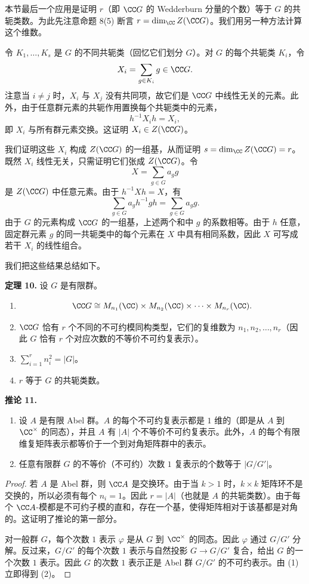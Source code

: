 本节最后一个应用是证明 $r$（即 $\CC G$ 的 Wedderburn 分量的个数）等于 $G$ 的共轭类数。为此先注意命题 8(5) 断言 $r=\dim_{\CC}Z(\CC G)$。我们用另一种方法计算这个维数。

令 $K_1,
\ldots,K_s$ 是 $G$ 的不同共轭类（回忆它们划分 $G$）。对 $G$ 的每个共轭类 $K_i$，令
\[
  X_i=\sum_{g\in K_i}g\in\CC G.
\]
注意当 $i\neq j$ 时，$X_i$ 与 $X_j$ 没有共同项，故它们是 $\CC G$ 中线性无关的元素。此外，由于任意群元素的共轭作用置换每个共轭类中的元素，
\[
  h^{-1}X_i h=X_i,
\]
即 $X_i$ 与所有群元素交换。这证明 $X_i\in Z(\CC G)$。

我们证明这些 $X_i$ 构成 $Z(\CC G)$ 的一组基，从而证明 $s=\dim_{\CC}Z(\CC G)=r$。既然 $X_i$ 线性无关，只需证明它们张成 $Z(\CC G)$。令
\[
  X=\sum_{g\in G}a_g g
\]
是 $Z(\CC G)$ 中任意元素。由于 $h^{-1}Xh=X$，有
\[
  \sum_{g\in G} a_g h^{-1}gh=\sum_{g\in G}a_g g.
\]
由于 $G$ 的元素构成 $\CC G$ 的一组基，上述两个和中 $g$ 的系数相等。由于 $h$ 任意，固定群元素 $g$ 的同一共轭类中的每个元素在 $X$ 中具有相同系数，因此 $X$ 可写成若干 $X_i$ 的线性组合。

我们把这些结果总结如下。

\medskip
\noindent\textbf{定理 10.} 设 $G$ 是有限群。
\begin{enumerate}[label=(\arabic*)]
  \item
  \[
    \CC G\cong M_{n_1}(\CC)\times M_{n_2}(\CC)\times\cdots\times M_{n_r}(\CC).
  \]
  \item $\CC G$ 恰有 $r$ 个不同的不可约模同构类型，它们的复维数为 $n_1,n_2,
  \ldots,n_r$（因此 $G$ 恰有 $r$ 个对应次数的不等价不可约复表示）。
  \item $\sum_{i=1}^r n_i^2=|G|$。
  \item $r$ 等于 $G$ 的共轭类数。
\end{enumerate}

\medskip
\noindent\textbf{推论 11.}
\begin{enumerate}[label=(\arabic*)]
  \item 设 $A$ 是有限 Abel 群。$A$ 的每个不可约复表示都是 $1$ 维的（即是从 $A$ 到 $\CC^\times$ 的同态），并且 $A$ 有 $|A|$ 个不等价不可约复表示。此外，$A$ 的每个有限维复矩阵表示都等价于一个到对角矩阵群中的表示。
  \item 任意有限群 $G$ 的不等价（不可约）次数 $1$ 复表示的个数等于 $|G/G'|$。
\end{enumerate}

\begin{proof}
若 $A$ 是 Abel 群，则 $\CC A$ 是交换环。由于当 $k>1$ 时，$k\times k$ 矩阵环不是交换的，所以必须有每个 $n_i=1$。因此 $r=|A|$（也就是 $A$ 的共轭类数）。由于每个 $\CC A$-模都是不可约子模的直和，存在一个基，使得矩阵相对于该基都是对角的。这证明了推论的第一部分。

对一般群 $G$，每个次数 $1$ 表示 $\varphi$ 是从 $G$ 到 $\CC^\times$ 的同态。因此 $\varphi$ 通过 $G/G'$ 分解。反过来，$G/G'$ 的每个次数 $1$ 表示与自然投影 $G\to G/G'$ 复合，给出 $G$ 的一个次数 $1$ 表示。因此 $G$ 的次数 $1$ 表示正是 Abel 群 $G/G'$ 的不可约表示。由 (1) 立即得到 (2)。
\end{proof}

